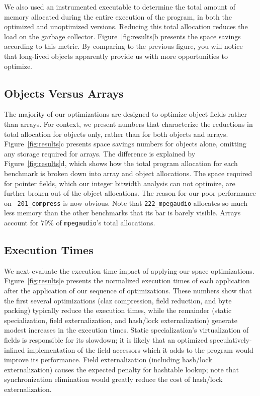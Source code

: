 \documentclass[oribibl]{llncs}
\begin{document}
We also used an instrumented executable to determine the total amount
of memory allocated during the entire execution of the program, in
both the optimized and unoptimized versions.  Reducing this total
allocation reduces the load on the garbage collector.
Figure~\ref{fig:results}b presents the space savings according to this
metric.  By comparing to the previous figure, you will notice that
long-lived objects apparently provide us with more opportunities to
optimize.
%
\subsection{Objects Versus Arrays}
%
The majority of our optimizations are designed to optimize
object fields rather than arrays. For context, we present numbers 
that characterize the reductions in total allocation for objects only,
rather than for both objects and arrays. Figure~\ref{fig:results}c
presents space savings numbers for objects alone, omitting
any storage required for arrays.  The difference is explained by
Figure~\ref{fig:results}d, which shows how the total
program allocation for each benchmark is broken down into array and
object allocations.  The space required for pointer fields, which our
integer bitwidth analysis can not optimize, are further broken out of
the object allocations.
The reason for our poor performance on {\tt
  201\_compress} is now obvious.  Note that {\tt 222\_mpegaudio}
allocates so much less memory than the other benchmarks that its bar
is barely visible.  Arrays account for 79\% of {\tt mpegaudio}'s total
allocations.
%
\subsection{Execution Times} 
\label{sec:byte-pack}
%
We next evaluate the execution time impact of applying our space
optimizations. Figure~\ref{fig:results}e presents the normalized execution 
times of each application after the application of our sequence
of optimizations. These numbers show that the first several
optimizations (claz compression, field reduction, and byte packing)
typically reduce the execution times, while the
remainder (static specialization, field externalization, and  hash/lock
externalization) generate modest increases in the execution times. 
Static specialization's virtualization of fields is responsible for
its slowdown; it is likely that an optimized speculatively-inlined
implementation of the field accessors which it adds to the program
would improve its performance.  Field externalization (including
hash/lock externalization) causes the expected penalty for hashtable
lookup; note that synchronization elimination would greatly reduce the
cost of hash/lock externalization.
%
%
\end{document}

